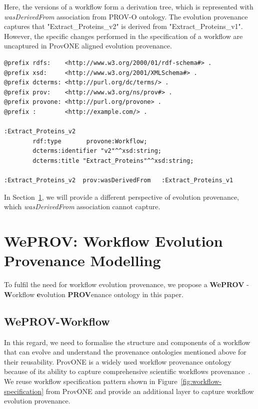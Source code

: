 \documentclass[ao]{iosart2x}
\begin{document}
Here, the versions of a workflow form a derivation tree, which is represented with \textit{wasDerivedFrom} association from PROV-O ontology. The evolution provenance captures that "Extract\_Proteins\_v2" is derived from "Extract\_Proteins\_v1". 
However, the specific changes performed in the specification of a workflow are uncaptured in ProvONE aligned evolution provenance. 

\begin{lstlisting}[frame=single, caption={ProvONE aligned evolution provenance},label={lst:provone-prov}]
@prefix rdfs:    <http://www.w3.org/2000/01/rdf-schema#> .
@prefix xsd:     <http://www.w3.org/2001/XMLSchema#> .
@prefix dcterms: <http://purl.org/dc/terms/> .
@prefix prov:    <http://www.w3.org/ns/prov#> .
@prefix provone: <http://purl.org/provone> .
@prefix :        <http://example.com/> .

:Extract_Proteins_v2
        rdf:type       provone:Workflow;
        dcterms:identifier "v2"^^xsd:string;
        dcterms:title "Extract_Proteins"^^xsd:string;
        
:Extract_Proteins_v2  prov:wasDerivedFrom   :Extract_Proteins_v1

\end{lstlisting}

In Section~\ref{sec:weprov}, we will provide a different perspective of evolution provenance, which \textit{wasDerivedFrom} association cannot capture. 

\section{WePROV: Workflow Evolution Provenance Modelling}
\label{sec:weprov}

To fulfil the need for workflow evolution provenance, we propose a \textbf{WePROV} - \textbf{W}orkflow \textbf{e}volution \textbf{PROV}enance ontology in this paper. 

\subsection{WePROV-Workflow}
\label{subsec:weprov-worflow}

In this regard, we need to formalise the structure and components of a workflow that can evolve and understand the provenance ontologies mentioned above for their reusability. ProvONE is a widely used workflow provenance ontology because of its ability to capture comprehensive scientific workflows provenance~\citep{prabhune2018p}. We reuse workflow specification pattern shown in Figure~\ref{fig:workflow-specification} from ProvONE and provide an additional layer to capture workflow evolution provenance.  
\end{document}
